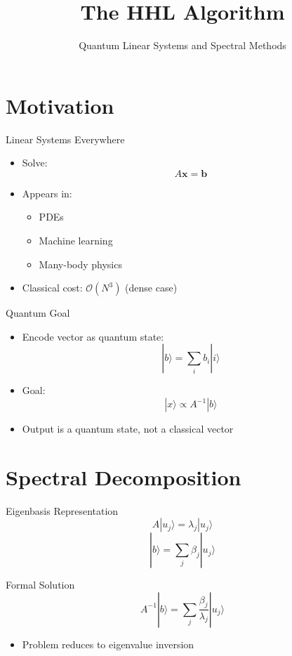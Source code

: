 \documentclass{beamer}
\title{The HHL Algorithm}
\subtitle{Quantum Linear Systems and Spectral Methods}
\author{}
\date{}
\begin{document}
\frame{\titlepage}

\section{Motivation}

\begin{frame}{Linear Systems Everywhere}
\begin{itemize}
\item Solve:
\[
A \mathbf{x} = \mathbf{b}
\]
\item Appears in:
\begin{itemize}
\item PDEs
\item Machine learning
\item Many-body physics
\end{itemize}
\item Classical cost: $\mathcal{O}(N^3)$ (dense case)
\end{itemize}
\end{frame}


\begin{frame}{Quantum Goal}
\begin{itemize}
\item Encode vector as quantum state:
\[
|b\rangle = \sum_i b_i |i\rangle
\]
\item Goal:
\[
|x\rangle \propto A^{-1}|b\rangle
\]
\item Output is a quantum state, not a classical vector
\end{itemize}
\end{frame}

\section{Spectral Decomposition}

\begin{frame}{Eigenbasis Representation}
\[
A |u_j\rangle = \lambda_j |u_j\rangle
\]
\[
|b\rangle = \sum_j \beta_j |u_j\rangle
\]
\end{frame}


\begin{frame}{Formal Solution}
\[
A^{-1}|b\rangle = \sum_j \frac{\beta_j}{\lambda_j} |u_j\rangle
\]
\begin{itemize}
\item Problem reduces to eigenvalue inversion
\end{itemize}
\end{frame}
\end{document}
